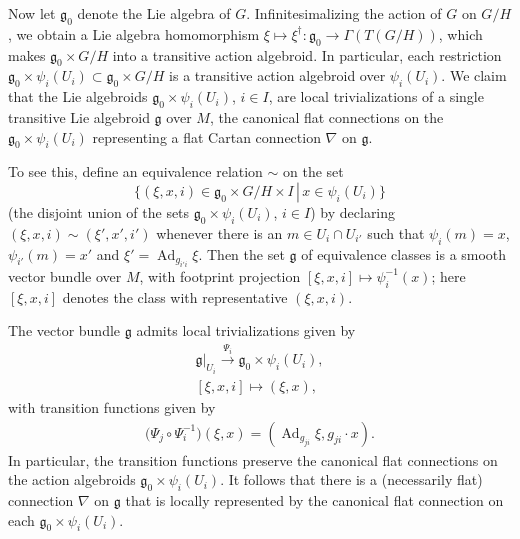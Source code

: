 \documentclass[pdftex]{sigma}
\DeclareMathOperator{\Adjoint}{Ad}
\newcommand\suchthat{\,\left\vert\right.\, }
\numberwithin{equation}{section}
\begin{document}
Now let ${\mathfrak g}_0$ denote the Lie algebra of
$G$. Inf\/initesimalizing the action of $G$ on $G/H$, we obtain a Lie
algebra homomorphism $\xi \mapsto \xi^\dagger \colon {\mathfrak g}_0
\rightarrow \Gamma(T(G/H)) $, which makes ${\mathfrak g}_0 \times G/H$
into a transitive action algebroid. In particular, each restriction
${\mathfrak g}_0 \times \psi_i(U_i) \subset {\mathfrak g}_0 \times
G/H$ is a transitive action algebroid over $\psi_i(U_i)$. We claim
that the Lie algebroids ${\mathfrak g}_0 \times \psi_i(U_i) $, $i \in
I$, are local trivializations of a single transitive Lie algebroid
${\mathfrak g} $ over $M$, the canonical f\/lat connections on the
${\mathfrak g}_0 \times \psi_i(U_i)$ representing a f\/lat Cartan
connection $\nabla $ on $\mathfrak g$.

To see this, def\/ine an equivalence relation $\sim$ on the
set
\[
\{(\xi,x,i) \in {\mathfrak g}_0 \times G/H \times I\suchthat x
\in \psi_i(U_i)\}
\] (the disjoint union of the sets ${\mathfrak g}_0
\times \psi_i(U_i)$, $i\in I$) by declaring
$(\xi,x,i)\sim(\xi',x',i')$ whenever there is an $m\in U_i\cap U_{i'}$
such that $\psi_i(m)=x$, $\psi_{i'}(m)=x'$ and
$\xi'=\Adjoint_{g_{i'i}}\xi$. Then the set ${\mathfrak g}$ of
equivalence classes is a smooth vector bundle over $M$, with footprint
projection $[\xi,x,i]\mapsto \psi_i^{-1}(x)$; here $[\xi,x, i]$
denotes the class with representative $(\xi,x,i)$.

The vector bundle $\mathfrak g$ admits local trivializations given by
\begin{gather*}
  {\mathfrak g}|_{U_i} \xrightarrow{\Psi_i}{\mathfrak g}_0 \times \psi_i(U_i), \\
  [\xi,x,i] \mapsto (\xi,x),
\end{gather*}
with transition functions given by
\begin{gather*}
  \big(\Psi_j \circ
  \Psi_i^{-1}\big)(\xi,x)=(\Adjoint_{g_{ji}}\xi,g_{ji}\cdot x).%
\end{gather*}
In particular, the transition functions preserve the canonical f\/lat
connections on the action algebroids ${\mathfrak g}_0 \times
\psi_i(U_i)$. It follows that there is a (necessarily f\/lat) connection
$\nabla$ on $\mathfrak g$ that is locally represented by the canonical
f\/lat connection on each ${\mathfrak g}_0 \times \psi_i(U_i)$.
\end{document}
